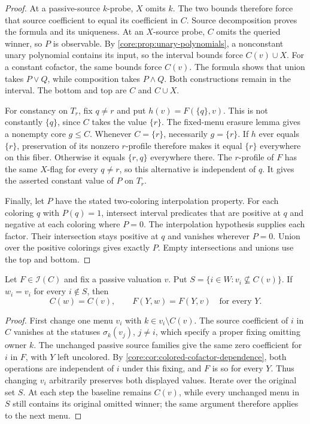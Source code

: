 \begin{proof}
At a passive-source $k$-probe, $X$ omits $k$. The two bounds therefore
force that source coefficient to equal its coefficient in $C$.
Source decomposition proves the formula and its uniqueness. At an
$X$-source probe, $C$ omits the queried winner, so $P$ is observable.
By \cref{core:prop:unary-polynomials}, a nonconstant unary polynomial
contains its input, so the interval bounds force $C(v)\cup X$.
For a constant cofactor, the same bounds force $C(v)$.
The formula shows that union takes $P\lor Q$, while composition takes
$P\land Q$. Both constructions remain in the interval. The bottom and
top are $C$ and $C\cup X$.

For constancy on $T_r$, fix $q\ne r$ and put $h(v)=F(\{q\},v)$.
This is not constantly $\{q\}$, since $C$ takes the value $\{r\}$.
The fixed-menu erasure lemma gives a nonempty core $g\leq C$.
Whenever $C=\{r\}$, necessarily $g=\{r\}$.
If $h$ ever equals $\{r\}$, preservation of its nonzero $r$-profile
therefore makes it equal $\{r\}$ everywhere on this fiber. Otherwise
it equals $\{r,q\}$ everywhere there. The $r$-profile of $F$ has the
same $X$-flag for every $q\ne r$, so this alternative is independent
of $q$. It gives the asserted constant value of $P$ on $T_r$.

Finally, let $P$ have the stated two-coloring interpolation property.
For each coloring $q$ with $P(q)=1$, intersect interval predicates
that are positive at $q$ and negative at each coloring where $P=0$.
The interpolation hypothesis supplies each factor. Their intersection
stays positive at $q$ and vanishes wherever $P=0$. Union over the
positive colorings gives exactly $P$. Empty intersections and unions
use the top and bottom.
\end{proof}

\begin{lemma}
\label{core:lem:interval-passive-erasure}
Let $F\in\mathcal I(C)$ and fix a passive valuation $v$. Put
$S=\{i\in W:v_i\nsubseteq C(v)\}$.
If $w_i=v_i$ for every $i\notin S$, then
\[
 C(w)=C(v),\qquad F(Y,w)=F(Y,v)\quad\text{for every }Y.
\]
\end{lemma}
\begin{proof}
First change one menu $v_i$ with $k\in v_i\setminus C(v)$.
The source coefficient of $i$ in $C$ vanishes at the statuses
$\sigma_k(v_j)$, $j\ne i$, which specify a proper fixing omitting
owner $k$. The unchanged passive source families give the same zero
coefficient for $i$ in $F$, with $Y$ left uncolored.
By \cref{core:cor:colored-cofactor-dependence}, both operations are
independent of $i$ under this fixing, and $F$ is so for every $Y$.
Thus changing $v_i$ arbitrarily preserves both displayed values.
Iterate over the original set $S$. At each step the baseline remains
$C(v)$, while every unchanged menu in $S$ still contains its original
omitted winner; the same argument therefore applies to the next menu.
\end{proof}

